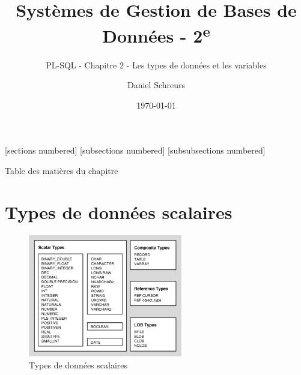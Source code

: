 \documentclass[10pt]{beamer}
\title{Systèmes de Gestion de Bases de Données - 2\textsuperscript{e}}
\subtitle{PL-SQL - Chapitre 2 - Les types de données et les variables}
\date{\today}
\author{Daniel Schreurs}
\institute{Haute École de Province de Liège}
\begin{document}
\maketitle

[sections numbered]
[subsections numbered]
[subsubsections numbered]
\begin{frame}[allowframebreaks]{Table des matières du chapitre}
    \tableofcontents[subsectionstyle=show/show/hide,subsubsectionstyle=show/show/hide,]
\end{frame}

\section{Types de données scalaires}
\tocss
\begin{frame}{\secname}
    \begin{figure}
        \begin{center}
            \includegraphics[width=0.60\textwidth]{../assets/img/scalar-type.png}
            \caption{Types de données scalaires}
        \end{center}
    \end{figure}
\end{frame}
\end{document}
